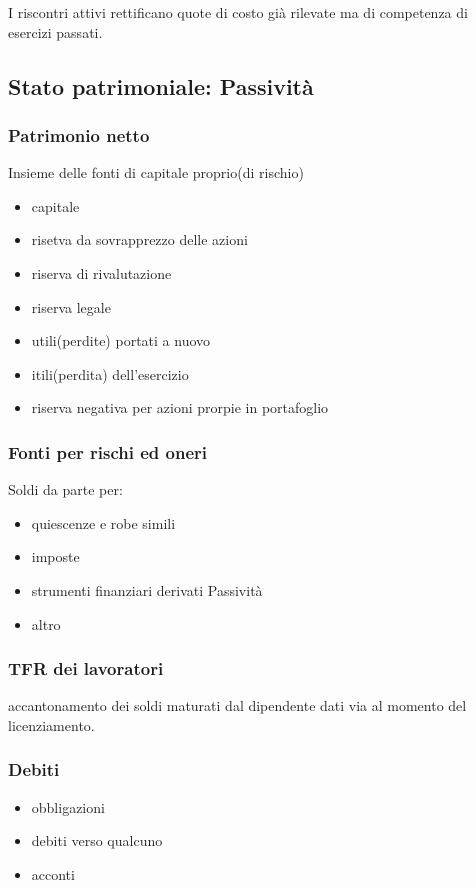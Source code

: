 I riscontri attivi rettificano quote di costo già rilevate ma di competenza di esercizi passati.


\subsection{Stato patrimoniale: Passività}
\subsubsection{Patrimonio netto}
Insieme delle fonti di capitale proprio(di rischio)
\begin{itemize}
    \item capitale
    \item risetva da sovrapprezzo delle azioni
    \item riserva di rivalutazione
    \item riserva legale
    \item utili(perdite) portati a nuovo
    \item itili(perdita) dell'esercizio
    \item riserva negativa per azioni prorpie in portafoglio 
\end{itemize}

\subsubsection{Fonti per rischi ed oneri}

Soldi da parte per:
\begin{itemize}
    \item quiescenze e robe simili
    \item imposte
    \item strumenti finanziari derivati Passività
    \item altro
\end{itemize}

\subsubsection{TFR dei lavoratori}
accantonamento dei soldi maturati dal dipendente dati via al momento del licenziamento.

\subsubsection{Debiti}
\begin{itemize}
    \item obbligazioni
    \item debiti verso qualcuno
    \item acconti
\end{itemize}

